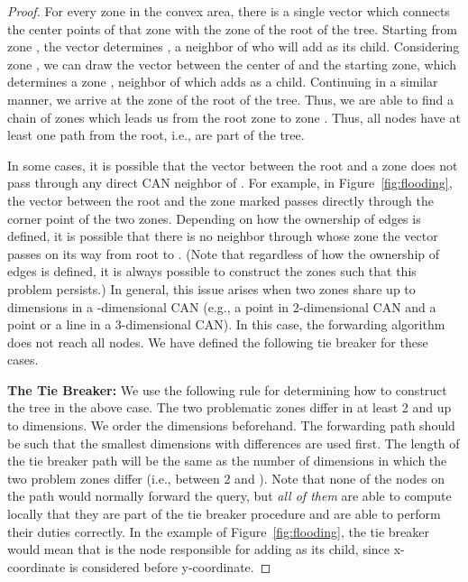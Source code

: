 \documentclass[fleqn,12pt,twoside]{article}
\begin{document}
\begin{proof}
  For every zone  in the convex area, there is a single vector
  which connects the center points of that zone with the zone of the
  root of the tree. Starting from zone , the vector determines ,
  a neighbor of  who will add  as its child.  Considering zone
  , we can draw the vector between the center of  and the
  starting zone, which determines a zone , neighbor of  which
  adds  as a child. Continuing in a similar manner, we arrive at
  the zone of the root of the tree. Thus, we are able to find a chain
  of zones which leads us from the root zone to zone . Thus,
  all nodes have at least one path from the root, i.e., are part of
  the tree.

  In some cases, it is possible that the vector between the
  root and a zone  does not pass through any direct CAN neighbor of
  . For example, in Figure~\ref{fig:flooding}, the vector between
  the root and the zone marked  passes directly through the corner
  point of the two zones. Depending on how the ownership of edges is
  defined, it is possible that there is no neighbor through whose zone
  the vector passes on its way from root to .  (Note that
  regardless of how the ownership of edges is defined, it is always
  possible to construct the zones such that this problem persists.) In
  general, this issue arises when two zones share up to 
  dimensions in a -dimensional CAN (e.g., a point in 2-dimensional
  CAN and a point or a line in a 3-dimensional CAN). In this case, the
  forwarding algorithm does not reach all nodes. We have defined the
  following tie breaker for these cases.

  \textbf{The Tie Breaker:} We use the following rule for determining
  how to construct the tree in the above case. The two problematic
  zones differ in at least 2 and up to  dimensions. We order the
  dimensions beforehand.  The forwarding path should be such that the
  smallest dimensions with differences are used first. The length of
  the tie breaker path will be the same as the number of dimensions in
  which the two problem zones differ (i.e., between 2 and ). Note
  that none of the nodes on the path would normally forward the query,
  but \emph{all of them} are able to compute locally that they are
  part of the tie breaker procedure and are able to perform their
  duties correctly. In the example of Figure~\ref{fig:flooding}, the
  tie breaker would mean that  is the node responsible for adding
   as its child, since x-coordinate is considered before
  y-coordinate.
\end{proof}
\end{document}
